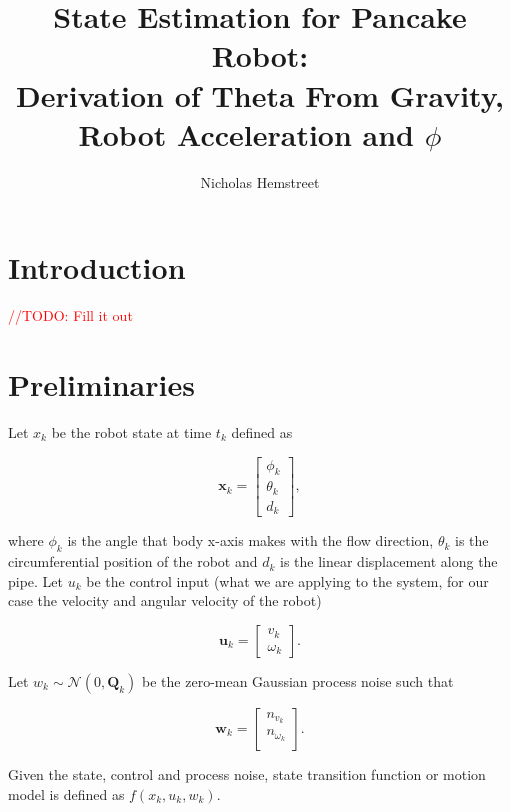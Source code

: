 \documentclass[12pt]{article}
\title{State Estimation for Pancake Robot: \\ \small{Derivation of Theta From Gravity, Robot Acceleration and $\phi$}}
\author{Nicholas Hemstreet}
\date{}
\newcommand{\cmt}[1]{\textcolor{red}{//TODO: #1}}
\begin{document}
\maketitle

\section{Introduction}

\cmt{Fill it out}

\section{Preliminaries}

Let $x_k$ be the robot state at time $t_k$ defined as 

\begin{equation}
\mathbf{x}_k = 
\begin{bmatrix}
	\phi_k \\
	\theta_k \\
	d_k
\end{bmatrix},
\end{equation}

where $\phi_k$ is the angle that body x-axis makes with the flow direction, $\theta_k$ is the circumferential position of the robot and $d_k$ is the linear displacement along the pipe. Let $u_k$ be the control input (what we are applying to the system, for our case the velocity and angular velocity of the robot) 

\begin{equation}\label{eq:control-vector}
\mathbf{u}_k = 
\begin{bmatrix}
	v_k \\
	\omega_k
\end{bmatrix}.
\end{equation}  

Let $w_k \sim \mathcal{N}(0, \mathbf{Q}_k)$ be the zero-mean Gaussian process noise such that 

\begin{equation}\label{eq:control-noise}
	\mathbf{w}_k = 
	\begin{bmatrix}
		n_{v_k} \\
		n_{\omega_k} \\
	\end{bmatrix}.
\end{equation}

Given the state, control and process noise, state transition function or motion model is defined as $f(x_k, u_k,w_k)$. \\
\end{document}
